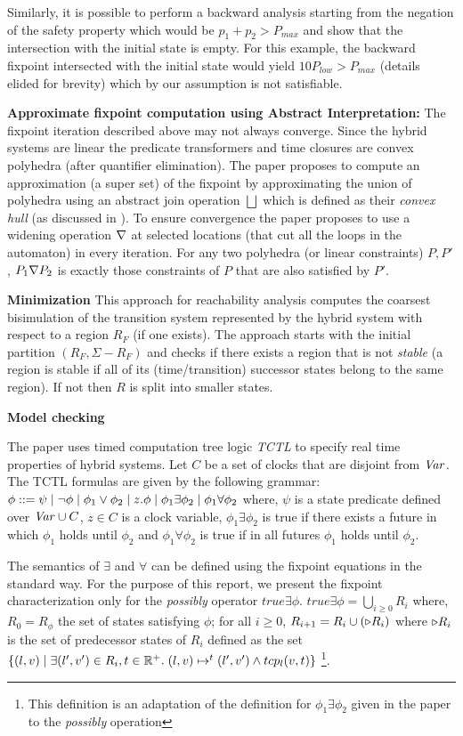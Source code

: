 Similarly, it is possible to perform a backward analysis starting from the negation of the safety property
which would be $p_1 + p_2 > P_{max}$ and show that the intersection with the initial state is empty.
For this example, the backward fixpoint intersected with the initial state would yield $10 P_{low} > P_{max}$
(details elided for brevity) which by our assumption is not satisfiable.

\textbf{Approximate fixpoint computation using Abstract Interpretation:}
The fixpoint iteration described above may not always converge. Since the hybrid  systems are linear
the predicate transformers and time closures are convex polyhedra (after quantifier elimination).
The paper proposes to compute an approximation (a super set) of the fixpoint by approximating the 
union of polyhedra  using an abstract join operation $\bigsqcup$ which is defined as their \emph{convex hull}
(as discussed in \cite{pcousot:1975}).
To ensure convergence the paper proposes to use a widening operation $\nabla$ at selected locations (that cut
all the loops in the automaton) in every iteration. For any two polyhedra (or linear constraints) 
$P,P'$, $P_1 \nabla P_2$  is exactly those constraints of $P$ that are also satisfied by $P'$.

\textbf{Minimization}
This approach for reachability analysis computes the coarsest bisimulation of the transition system 
represented by the hybrid system with respect to a region $R_F$ (if one exists). The approach starts 
with the initial partition $(R_F,\Sigma - R_F)$ and checks if there exists a region that is not \emph{stable}
(a region is stable if all of its (time/transition) successor states belong to the same region). 
If not then $R$ is split into smaller states.

\textbf{Model checking}

The paper uses timed computation tree logic \emph{TCTL} to specify real time properties of hybrid systems.
Let $C$ be a set of clocks that are disjoint from $\mathit{Var}$. The TCTL formulas are given by the following grammar: 
$\phi ::= \psi \; | \; \neg \phi \; | \; \phi_1 \vee \phi_2 \; | \; z.\phi \; | \; \phi_1 \exists \phi_2 \; | \; \phi_1 \forall \phi_2$
where, $\psi$ is a state predicate defined over $\mathit{Var} \cup C$, $z \in C$ is a clock variable,
$\phi_1 \exists \phi_2$ is true if there exists a future in which $\phi_1$ holds until $\phi_2$ 
and $\phi_1 \forall \phi_2$ is true if in all futures $\phi_1$ holds until $\phi_2$.

The semantics of $\exists$ and $\forall$ can be defined using the fixpoint equations in the standard way.
For the purpose of this report, we present the fixpoint characterization only for 
the \emph{possibly} operator $true \exists \phi$.
$true \exists \phi = \bigcup_{i \ge 0} R_i$ where,
$R_0 = R_{\phi}$ the set of states satisfying $\phi$;
for all $i \ge 0$, $R_{i+1} = R_i \cup (\triangleright R_i)$ where $\triangleright R_i$ is the
set of predecessor states of $R_i$ defined as the set 
$\{ (l,v) \; | \; \exists (l',v') \in R_i, t \in \mathbb{R}^+. \; (l,v) \mapsto^t (l',v') \wedge tcp_l(v,t) \}$
\footnote{This definition is an adaptation of the definition for $\phi_1 \exists \phi_2$ given in the paper 
to the \emph{possibly} operation}.

